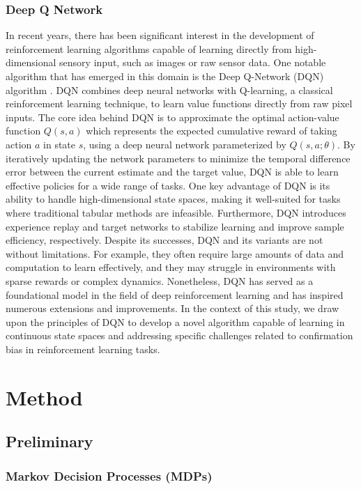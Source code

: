 \documentclass[10pt,letterpaper]{article}
\begin{document}
\subsubsection{Deep Q Network}
In recent years, there has been significant interest in the development of reinforcement learning algorithms capable of learning directly from high-dimensional sensory input, such as images or raw sensor data. One notable algorithm that has emerged in this domain is the Deep Q-Network (DQN) algorithm \cite{hester2018deep}. DQN combines deep neural networks with Q-learning, a classical reinforcement learning technique, to learn value functions directly from raw pixel inputs. The core idea behind DQN is to approximate the optimal action-value function $Q(s,a)$ which represents the expected cumulative reward of taking action $a$ in state $s$, using a deep neural network parameterized by $Q(s,a;\theta)$. By iteratively updating the network parameters to minimize the temporal difference error between the current estimate and the target value, DQN is able to learn effective policies for a wide range of tasks. One key advantage of DQN is its ability to handle high-dimensional state spaces, making it well-suited for tasks where traditional tabular methods are infeasible. Furthermore, DQN introduces experience replay and target networks to stabilize learning and improve sample efficiency, respectively. Despite its successes, DQN and its variants are not without limitations. For example, they often require large amounts of data and computation to learn effectively, and they may struggle in environments with sparse rewards or complex dynamics. Nonetheless, DQN has served as a foundational model in the field of deep reinforcement learning and has inspired numerous extensions and improvements. In the context of this study, we draw upon the principles of DQN to develop a novel algorithm capable of learning in continuous state spaces and addressing specific challenges related to confirmation bias in reinforcement learning tasks.
\section{Method}
\subsection{Preliminary}
\subsubsection{Markov Decision Processes (MDPs)}
\end{document}
